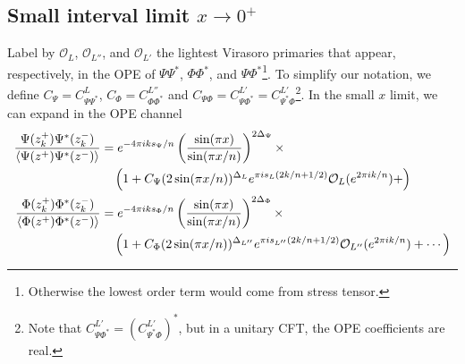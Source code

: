\documentclass[11pt]{article}
\newcommand{\mO}{\mathcal{O}}
\newcommand{\nn}{\nonumber}
\newcommand{\lb}{\left(}
\newcommand{\rb}{\right)}
\newcommand{\JM}[1]{\textcolor{orange}{#1}}
\begin{document}
\subsection{Small interval limit \texorpdfstring{$x\to 0^+$}{x -> 0+}}
Label by $\mO_L$, $\mO_{L''}$, and $\mO_{L'}$ the lightest Virasoro primaries that appear, respectively, in the OPE of $\Psi \Psi^*$, $\Phi\Phi^*$, and $\Psi\Phi^*$\footnote{Otherwise the lowest order
  term would come from stress tensor.}. 
  To simplify our notation, we define
   $C_{\Psi} = C^{L}_{\Psi\Psi^*}$, $C_{\Phi} = C^{L''}_{\Phi\Phi^*}$ and $C_{\Psi \Phi} = C^{L'}_{\Psi \Phi^*}=C^{L'}_{\Psi^*\Phi}$\footnote{Note that $C^{L'}_{\Psi\Phi^*}=(C^{L'}_{\Psi^*\Phi})^*$, but in a unitary CFT, the OPE coefficients are real.}.
   In the small $x$ limit, we can expand in the OPE
  channel
  \begin{align}
    \frac{\Psi(z_{k}^{+})\Psi^*(z_{k}^{-})}{\braket{\Psi(z^+)\Psi^*(z^-)}}&=e^{-4\pi i k s_{\Psi}/n}\lb
    \frac{\sin(\pi x)}{\sin(\pi x/n)}\rb^{2\Delta_{\Psi}}\times\nn \\
    &\quad\lb  1+ C_{\Psi}(2\sin(\pi x/n))^{\Delta_L}e^{\pi i s_L(2k/n+1/2)}\mO_L(e^{2\pi i k/n})+\rb  \\
    \frac{\Phi(z_{k}^{+})\Phi^*(z_{k}^{-})}{\braket{\Phi(z^+)\Phi^*(z^-)}}&=e^{-4\pi i k s_{\Phi}/n}\lb
    \frac{\sin(\pi x)}{\sin(\pi x/n)}\rb^{2\Delta_{\Phi}}\times\nn\\
    &\quad\lb  1+ C_{\Phi}(2\sin(\pi x/n))^{\Delta_{L''}}e^{\pi i s_{L''}(2k/n+1/2)}\mO_{L''}(e^{2\pi i k/n})+\cdots\rb 
  \end{align}
\end{document}

